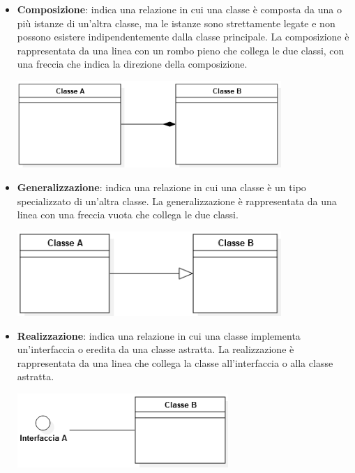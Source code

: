 \begin{itemize}
\begin{center}
	\end{center}
	\item \textbf{Composizione}: indica una relazione in cui una classe è composta da una o più istanze di un'altra classe, ma le istanze sono strettamente legate e non possono esistere indipendentemente dalla classe principale. La composizione è rappresentata da una linea con un rombo pieno che collega le due classi, con una freccia che indica la direzione della composizione.
	\begin{center}
		\includegraphics*[width=10cm]{../../../images/norme_di_progetto/composizioneClassi.png}
	\end{center}
	\item \textbf{Generalizzazione}: indica una relazione in cui una classe è un tipo specializzato di un'altra classe. La generalizzazione è rappresentata da una linea con una freccia vuota che collega le due classi.
	\begin{center}
		\includegraphics*[width=10cm]{../../../images/norme_di_progetto/generalizzazioneClassi.png}
	\end{center}
	\newpage
	\item \textbf{Realizzazione}: indica una relazione in cui una classe implementa un'interfaccia o eredita da una classe astratta. La realizzazione è rappresentata da una linea che collega la classe all'interfaccia o alla classe astratta.
	\begin{center}
		\includegraphics*[width=8cm]{../../../images/norme_di_progetto/realizzazioneClassi.png}
	\end{center}
\end{itemize}
